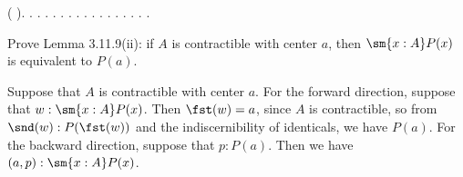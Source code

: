 \begin{coqdoccode}
\coqdocindent{1.00em}
\coqdoctac{\ensuremath{\exists}} ( ).\coqdoceol
\coqdocindent{1.00em}
 .\coqdoceol
\coqdocindent{1.00em}
 .  .  .\coqdoceol
\coqdocindent{1.00em}
\coqdoctac{\ensuremath{\exists}} .\coqdoceol
\coqdocindent{1.00em}
 .\coqdoceol
\coqdocindent{1.00em}
 .\coqdoceol
\coqdocindent{1.00em}
 .\coqdoceol
\coqdocindent{1.00em}
\coqdoctac{\ensuremath{\exists}} . .  .  .  .\coqdoceol
\coqdocnoindent
{}.\coqdoceol
\coqdocemptyline
\coqdocnoindent
{} .\coqdoceol
\coqdocemptyline
\coqdocnoindent
{}\coqdocindent{0.50em}
  .\coqdoceol
\coqdocemptyline
\end{coqdoccode}
Prove Lemma 3.11.9(ii): if $A$ is contractible with center $a$, then
$\sm{x:A}P(x)$ is equivalent to $P(a)$.


 \soln
Suppose that $A$ is contractible with center $a$.  For the forward direction,
suppose that $w : \sm{x:A} P(x)$.  Then $\fst(w) = a$, since $A$ is
contractible, so from $\snd(w) : P(\fst(w))$ and the indiscernibility
of identicals, we have $P(a)$.  For the backward direction, suppose
that $p : P(a)$.  Then we have $(a, p) : \sm{x:A} P(x)$.



